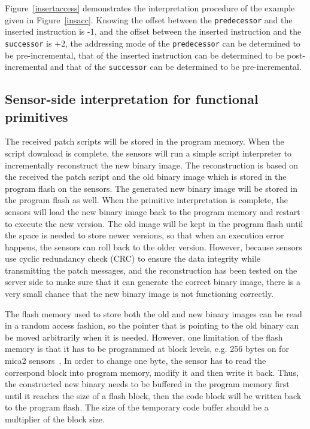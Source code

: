 Figure~\ref{insertaccess} demonstrates the interpretation procedure of the
example given in Figure~\ref{insacc}. Knowing the offset between the {\tt predecessor}
and the inserted instruction is -1, and the offset between the inserted
instruction and the {\tt successor} is +2, the addressing mode of the 
{\tt predecessor} can be determined to be pre-incremental, that of the inserted
instruction can be determined to be post-incremental and that of the
{\tt successor} can be determined to be pre-incremental.

\subsection{Sensor-side interpretation for functional primitives}

The received patch scripts will be stored in the program memory.
When the script download is complete, the sensors will run a simple script
interpreter to incrementally reconstruct the new binary image.
The reconstruction is based on the received the patch script and
the old binary image which is stored in the program flash on the
sensors.
The generated new binary image will be stored in the program flash as well.
When the primitive interpretation is complete, the sensors will load
the new binary image back to the program memory and restart
to execute the new version.
The old image will be kept in the program flash until the space is 
needed to store newer versions, so that when an execution error
happens, the sensors can roll back to the older version.
However, because sensors use cyclic redundancy check (CRC) to ensure the data integrity
while transmitting the patch messages, and the reconstruction
has been tested on the server side to make sure that it can generate
the correct binary image, there is a very small chance that the
new binary image is not functioning correctly.


The flash memory used to store both the old and new binary images
can be read in a random access fashion, so the pointer that is pointing
to the old binary can be moved arbitrarily when it is needed.
However, one limitation of the flash memory is that it has to be programmed 
at block levels, e.g. 256 bytes on for mica2 sensors~\cite{mica2-power}.
In order to change one byte, the sensor has to read the correspond block into
program memory, modify it and then write it back.
Thus, the constructed new binary needs to be buffered in the program memory
first until it reaches the size of a flash block, then the code block will be
written back to the program flash. The size of the temporary code buffer 
should be a multiplier of the block size.


